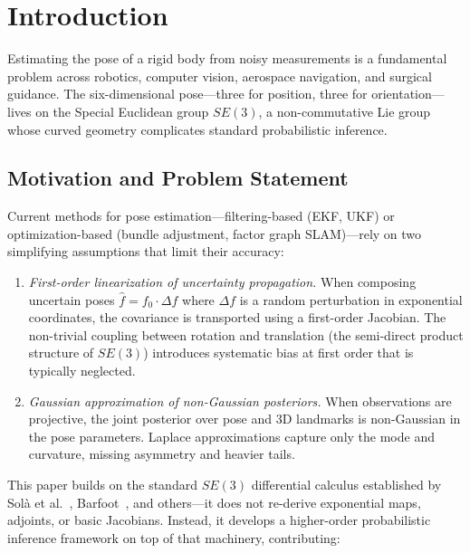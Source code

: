 \documentclass[journal]{IEEEtran}
\begin{document}
\section{Introduction}
\label{sec:intro}
 
Estimating the pose of a rigid body from noisy measurements is a 
fundamental problem across robotics, computer vision, aerospace 
navigation, and surgical guidance. The six-dimensional pose---three 
for position, three for orientation---lives on the Special Euclidean 
group $SE(3)$, a non-commutative Lie group whose curved geometry 
complicates standard probabilistic inference.
 
\subsection{Motivation and Problem Statement}
 
Current methods for pose estimation---filtering-based 
(EKF, UKF) or optimization-based (bundle adjustment, factor 
graph SLAM)---rely on two simplifying assumptions that limit 
their accuracy:
 
\begin{enumerate}
\item \emph{First-order linearization of uncertainty propagation.}
When composing uncertain poses $\hat{f} = f_0 \cdot \Delta f$ 
where $\Delta f$ is a random perturbation in exponential coordinates, 
the covariance is transported using a first-order Jacobian. 
The non-trivial coupling between rotation and translation 
(the semi-direct product structure of $SE(3)$) introduces 
systematic bias at first order that is typically neglected.
 
\item \emph{Gaussian approximation of non-Gaussian posteriors.}
When observations are projective, the joint posterior over 
pose and 3D landmarks is non-Gaussian in the pose parameters. 
Laplace approximations capture only the mode and curvature, 
missing asymmetry and heavier tails.
\end{enumerate}
 
This paper builds on the standard $SE(3)$ differential calculus 
established by Sol\`a et al.~\cite{sola2018micro}, 
Barfoot~\cite{barfoot2024}, and others---it does not re-derive 
exponential maps, adjoints, or basic Jacobians. Instead, it 
develops a higher-order probabilistic inference framework on top 
of that machinery, contributing:
 
\end{document}
